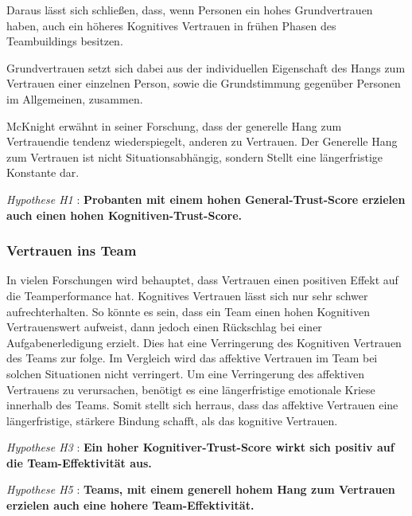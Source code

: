 \documentclass[a4paper,11pt]{article}%
\renewcommand{\\}{\vspace*{0.5\baselineskip} \newline}
\begin{document}
Daraus lässt sich schließen, dass, wenn Personen ein hohes Grundvertrauen haben, auch ein höheres Kognitives Vertrauen in frühen Phasen des Teambuildings besitzen. \\

Grundvertrauen setzt sich dabei aus der individuellen Eigenschaft des Hangs zum Vertrauen einer einzelnen Person, sowie die Grundstimmung gegenüber Personen im Allgemeinen, zusammen. \citep{couch1996assessment} \\

McKnight \citep[p.6]{mcknight2011trust} erwähnt in seiner Forschung, dass der \glqq generelle Hang zum Vertrauen\grqq die tendenz wiederspiegelt, anderen zu Vertrauen. Der Generelle Hang zum Vertrauen ist nicht Situationsabhängig, sondern Stellt eine längerfristige Konstante dar.

\textit{Hypothese H1} : \textbf{Probanten mit einem hohen General-Trust-Score erzielen auch einen hohen Kognitiven-Trust-Score.}
\\
\subsubsection{Vertrauen ins Team}

In vielen Forschungen wird behauptet, dass Vertrauen einen positiven Effekt auf die Teamperformance hat. \citep{mcallister1995affect} \citep{mayer1995integrative} \citep{dirks2002trust}
Kognitives Vertrauen lässt sich nur sehr schwer aufrechterhalten. So könnte es sein, dass ein Team einen hohen Kognitiven Vertrauenswert aufweist, dann jedoch einen Rückschlag bei einer Aufgabenerledigung erzielt. Dies hat eine Verringerung des Kognitiven Vertrauen des Teams zur folge. \citep[p.29-31]{mcallister1995affect}
Im Vergleich wird das affektive Vertrauen im Team bei solchen Situationen nicht verringert. Um eine Verringerung des affektiven Vertrauens zu verursachen, benötigt es eine längerfristige emotionale Kriese innerhalb des Teams. Somit stellt sich herraus, dass das affektive Vertrauen eine längerfristige, stärkere Bindung schafft, als das kognitive Vertrauen.  \citep[p.29-31]{mcallister1995affect} \\

\textit{Hypothese H3} : \textbf{Ein hoher Kognitiver-Trust-Score wirkt sich positiv auf die Team-Effektivität aus.}\\

\textit{Hypothese H5} : \textbf{Teams, mit einem generell hohem Hang zum Vertrauen erzielen auch eine hohere Team-Effektivität.}
\end{document}
